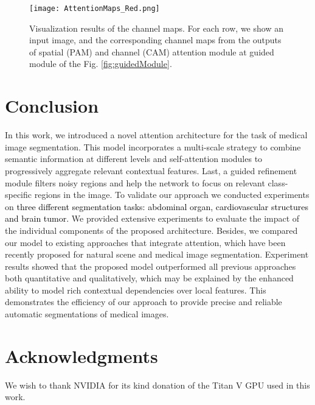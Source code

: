 \documentclass[journal]{IEEEtran}
\begin{document}
\begin{figure}[h!]
    \centering
    \texttt{[image: AttentionMaps\_Red.png]}
    \caption{Visualization results of the channel maps. For each row, we show an input image, and the corresponding channel maps from the outputs of spatial (PAM) and channel (CAM) attention module at guided module of the Fig. \ref{fig:guidedModule}.}
    \label{fig:attmaps}
\end{figure}

\section{Conclusion}

In this work, we introduced a novel attention architecture for the task of medical image segmentation. This model incorporates a multi-scale strategy to combine semantic information at different levels and self-attention modules to progressively aggregate relevant contextual features. Last, a guided refinement module filters noisy regions and help the network to focus on relevant class-specific regions in the image. To validate our approach we conducted experiments on \textcolor{black}{ three different segmentation tasks: abdominal organ, cardiovascular structures and brain tumor.} We provided extensive experiments to evaluate the impact of the individual components of the proposed architecture. Besides, we compared our model to existing approaches that integrate attention, which have been recently proposed for natural scene \cite{fu2018dual,li2018pyramid} and medical image \cite{ronneberger2015u,wang18d,schlemper2019attention} segmentation. Experiment results showed that the proposed model outperformed all previous approaches both quantitative and qualitatively, which may be explained by the enhanced ability to model rich contextual dependencies over local features. This demonstrates the efficiency of our approach to provide precise and reliable automatic segmentations of medical images.


\section*{Acknowledgments}

We wish to thank NVIDIA for its kind donation of the Titan V GPU used in this work.






\clearpage
\end{document}
